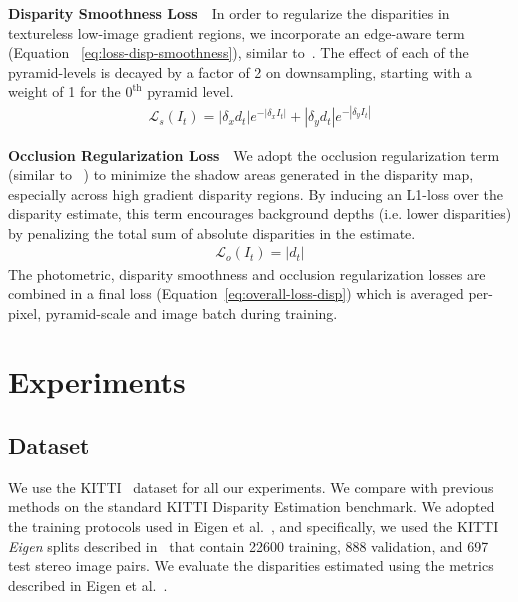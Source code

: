 \documentclass[letterpaper, 10 pt, conference]{ieeeconf}  \IEEEoverridecommandlockouts
\begin{document}
\textbf{Disparity Smoothness Loss}~~In order to regularize the disparities in textureless low-image gradient regions, we incorporate an edge-aware term (Equation ~\ref{eq:loss-disp-smoothness}), similar to~\cite{godard2017unsupervised,yang2018deep,li2017undeepvo}. The effect of each of the pyramid-levels is decayed by a factor of 2 on downsampling, starting with a weight of 1 for the $0^\text{th}$ pyramid level. 
\begin{align}
  \mathcal{L}_{s}(I_t) = | \delta_x d_t | e^{-|\delta_x I_t|} + | \delta_y d_t | e^{-|\delta_y I_t|}
  \label{eq:loss-disp-smoothness}
\end{align}

\textbf{Occlusion Regularization Loss}~~We adopt the occlusion regularization term (similar to ~\cite{yang2018deep}) to minimize the shadow areas generated in the disparity map, especially across high gradient disparity regions. By inducing an L1-loss over the disparity estimate, this term encourages background depths (i.e. lower disparities) by penalizing the total sum of absolute disparities in the estimate. 
\begin{align}
  \mathcal{L}_{o}(I_t) = | d_t | 
  \label{eq:loss-occ-reg}
\end{align}
The photometric, disparity smoothness and occlusion regularization losses are combined in a final loss (Equation~\ref{eq:overall-loss-disp}) which is averaged per-pixel, pyramid-scale and image batch during training. 














 






 \section{Experiments}
\label{sec:experiments}

\subsection{Dataset}

We use the KITTI~\cite{geiger2013vision} dataset for all our experiments. We compare with previous methods on the standard KITTI Disparity Estimation benchmark. We adopted the training protocols used in Eigen et al.~\cite{eigen2014depth}, and specifically, we used the KITTI \textit{Eigen} splits described in~\cite{eigen2014depth} that contain 22600 training, 888 validation, and 697 test stereo image pairs. We evaluate the disparities estimated using the metrics described in Eigen et al.~\cite{eigen2014depth}. 
\end{document}
